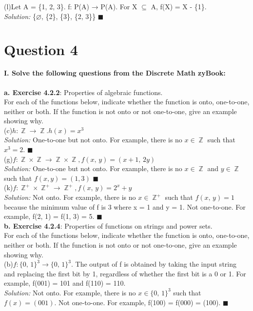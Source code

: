 \documentclass[11pt]{article}
\DeclareMathOperator*{\Z}{\mathbb{Z}}\relax
\begin{document}
		(l)Let A = \{1, 2, 3\}. f: P(A) → P(A). For X  $\subseteq$ A, f(X) = X - \{1\}.\\
			\textit{Solution: }
			\{$\varnothing$, \{2\}, \{3\}, \{2, 3\}\} $\blacksquare$ \\
	\newpage
	
	\section*{Question 4}
	\textbf{I. Solve the following questions from the Discrete Math zyBook:}\\
	\\
		\textbf{a. Exercise 4.2.2}: Properties of algebraic functions.\\
		For each of the functions below, indicate whether the function is onto, one-to-one, neither or both. 
		If the function is not onto or not one-to-one, give an example showing why. \\
		
		(c)$ h: \Z \rightarrow \Z. h(x) = x^3 $\\
			\textit{Solution: }
			One-to-one but not onto. For example, there is no  $x \in \Z$ such that $x^3 = 2$. $\blacksquare$ \\
			
		(g)$ f: \Z \times \Z \rightarrow \Z \times \Z, f(x,\, y) = (x+1,\, 2y)$\\
			\textit{Solution: }
			One-to-one but not onto. For example, there is no  $x \in \Z$ and $y \in \Z$ such that $f(x, y) = (1, 3)$ $\blacksquare$ \\
		
		(k)$f: \Z^+ \times \Z^+ \rightarrow \Z^+, f(x, \, y) = 2^x + y$\\
			\textit{Solution: }
			Not onto. For example, there is no $x \in \Z^+$ such that $f(x,\, y)  = 1$ because the minimum value of f is 3 where x = 1 and y = 1.
			Not one-to-one. For example, f(2, 1) = f(1, 3) = 5. $\blacksquare$ \\
			
		\textbf{b. Exercise 4.2.4}: Properties of functions on strings and power sets. \\
		For each of the functions below, indicate whether the function is onto, one-to-one, neither or both. 
		If the function is not onto or not one-to-one, give an example showing why. \\
		
		(b)$f: \{0, \,1\}^3 \rightarrow \{0,\, 1\}^3$. The output of f is obtained by taking the input string and replacing the first bit by 1, 
		regardless of whether the first bit is a 0 or 1. For example, f(001) = 101 and f(110) = 110.\\
		\textit{Solution: }
		Not onto. For example, there is no $x \in \{0, \, 1\}^3$ such that $f(x)  = (001)$.
		Not one-to-one. For example, f(100) = f(000) = (100). $\blacksquare$ \\
		
\end{document}
